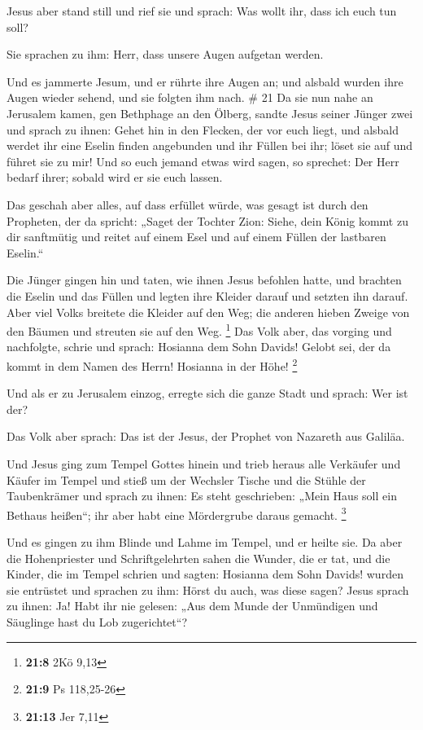  Jesus aber stand still und rief sie und sprach: Was
wollt ihr, dass ich euch tun soll?

 Sie sprachen zu ihm: Herr, dass unsere Augen aufgetan
werden.

 Und es jammerte Jesum, und er rührte ihre Augen an; und
alsbald wurden ihre Augen wieder sehend, und sie folgten ihm nach. \# 21
 Da sie nun nahe an Jerusalem kamen, gen Bethphage an den
Ölberg, sandte Jesus seiner Jünger zwei  und sprach zu
ihnen: Gehet hin in den Flecken, der vor euch liegt, und alsbald werdet
ihr eine Eselin finden angebunden und ihr Füllen bei ihr; löset sie auf
und führet sie zu mir!  Und so euch jemand etwas wird
sagen, so sprechet: Der Herr bedarf ihrer; sobald wird er sie euch
lassen.

 Das geschah aber alles, auf dass erfüllet würde, was
gesagt ist durch den Propheten, der da spricht:  „Saget
der Tochter Zion: Siehe, dein König kommt zu dir sanftmütig und reitet
auf einem Esel und auf einem Füllen der lastbaren Eselin.``

 Die Jünger gingen hin und taten, wie ihnen Jesus befohlen
hatte,  und brachten die Eselin und das Füllen und legten
ihre Kleider darauf und setzten ihn darauf.  Aber viel
Volks breitete die Kleider auf den Weg; die anderen hieben Zweige von
den Bäumen und streuten sie auf den Weg. \footnote{\textbf{21:8} 2Kö
  9,13}  Das Volk aber, das vorging und nachfolgte, schrie
und sprach: Hosianna dem Sohn Davids! Gelobt sei, der da kommt in dem
Namen des Herrn! Hosianna in der Höhe! \footnote{\textbf{21:9} Ps
  118,25-26}

 Und als er zu Jerusalem einzog, erregte sich die ganze
Stadt und sprach: Wer ist der?

 Das Volk aber sprach: Das ist der Jesus, der Prophet von
Nazareth aus Galiläa.

 Und Jesus ging zum Tempel Gottes hinein und trieb heraus
alle Verkäufer und Käufer im Tempel und stieß um der Wechsler Tische und
die Stühle der Taubenkrämer  und sprach zu ihnen: Es
steht geschrieben: „Mein Haus soll ein Bethaus heißen``; ihr aber habt
eine Mördergrube daraus gemacht. \footnote{\textbf{21:13} Jer 7,11}

 Und es gingen zu ihm Blinde und Lahme im Tempel, und er
heilte sie.  Da aber die Hohenpriester und
Schriftgelehrten sahen die Wunder, die er tat, und die Kinder, die im
Tempel schrien und sagten: Hosianna dem Sohn Davids! wurden sie
entrüstet  und sprachen zu ihm: Hörst du auch, was diese
sagen? Jesus sprach zu ihnen: Ja! Habt ihr nie gelesen: „Aus dem Munde
der Unmündigen und Säuglinge hast du Lob zugerichtet``?

